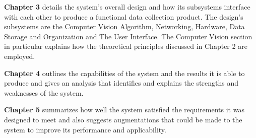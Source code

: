 \textbf{Chapter 3} details the system's overall design and how its subsystems interface with each other to produce a functional data collection product. The design's subsystems are the Computer Vision Algorithm, Networking, Hardware, Data Storage and Organization and The User Interface. The Computer Vision section in particular explains how the theoretical principles discussed in Chapter 2 are employed.

\textbf{Chapter 4} outlines the capabilities of the system and the results it is able to produce and gives an analysis that identifies and explains the strengths and weaknesses of the system.

\textbf{Chapter 5} summarizes how well the system satisfied the requirements it was designed to meet and also suggests augmentations that could be made to the system to improve its performance and applicability.



